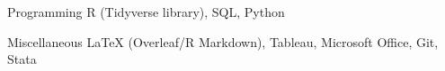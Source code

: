 


\begin{cvskills}

  \cvskill
    {Programming} %
    {R (Tidyverse library), SQL, Python} %

  \cvskill
    {Miscellaneous} %
    {LaTeX (Overleaf/R Markdown), Tableau, Microsoft Office, Git, Stata}


\end{cvskills}

